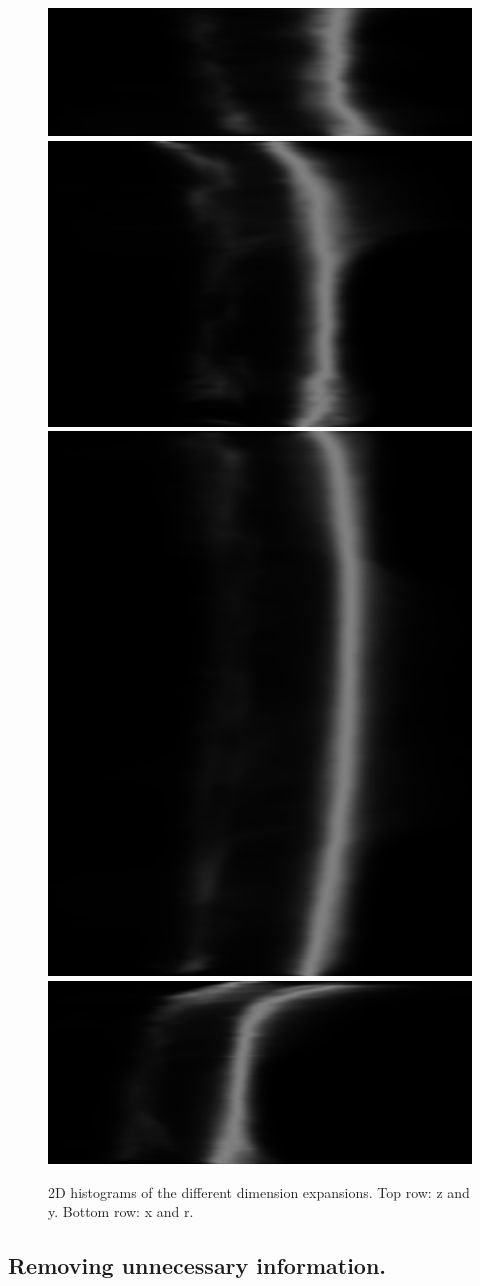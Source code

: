 \begin{figure}
    \centering
    \includegraphics[width=.49\linewidth]{figures/zb-bone_region3.png}
    \includegraphics[width=.49\linewidth]{figures/yb-bone_region3.png}
    \includegraphics[width=.49\linewidth]{figures/xb-bone_region3.png}
    \includegraphics[width=.49\linewidth]{figures/rb-bone_region3.png}
    \caption{2D histograms of the different dimension expansions. Top row: z and y. Bottom row: x and r. }
    \label{fig:2dhists}
\end{figure}

\subsection{Removing unnecessary information.}

